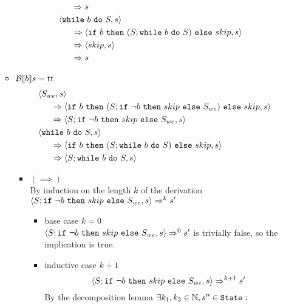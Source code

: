 \begin{exercise}
\begin{enumerate}
\begin{itemize}
\begin{align*}
                        \\&\quad\ \ \Rightarrow s
                        \\
                        &\left<\texttt{while}\ b\ \texttt{do}\ S, s\right>
                        \\&\quad\ \ \Rightarrow \left<\texttt{if}\ b\ \texttt{then}\ (S; \texttt{while}\ b\ \texttt{do}\ S)\ \texttt{else}\ skip, s\right>
                        \\&\quad\ \ \Rightarrow \left<skip, s\right>
                        \\&\quad\ \ \Rightarrow s
                    \end{align*}
                \item $\mathcal{B} \llbracket b \rrbracket s = \text{tt}$
                    \begin{align*}
                        &\left<S_{we}, s\right>
                        \\&\quad\ \ \Rightarrow \left<\texttt{if}\ b\ \texttt{then}\ (S; \texttt{if}\ \neg b\ \texttt{then}\ skip\ \texttt{else}\ S_{we})\ \texttt{else}\ skip, s\right>
                        \\&\quad\ \ \Rightarrow \left<S; \texttt{if}\ \neg b\ \texttt{then}\ skip\ \texttt{else}\ S_{we}, s\right>
                        \\
                        &\left<\texttt{while}\ b\ \texttt{do}\ S, s\right>
                        \\&\quad\ \ \Rightarrow \left<\texttt{if}\ b\ \texttt{then}\ (S; \texttt{while}\ b\ \texttt{do}\ S)\ \texttt{else}\ skip, s\right>
                        \\&\quad\ \ \Rightarrow \left<S; \texttt{while}\ b\ \texttt{do}\ S, s\right>
                    \end{align*}
                    \begin{itemize}
                        \item $(\implies)$ \vspace{0.2cm} \\
                            By induction on the length $k$ of the derivation \\ $\left<S; \texttt{if}\ \neg b\ \texttt{then}\ skip\ \texttt{else}\ S_{we}, s\right> \Rightarrow^k s'$
                            \begin{itemize}
                                \item base case $k=0$ \\
                                    $\left<S; \texttt{if}\ \neg b\ \texttt{then}\ skip\ \texttt{else}\ S_{we}, s\right> \Rightarrow^0 s'$ is trivially false, so the implication is true.
                                \item inductive case $k+1$ \vspace*{-0.3cm}
                                    \[ \left<S; \texttt{if}\ \neg b\ \texttt{then}\ skip\ \texttt{else}\ S_{we}, s\right> \Rightarrow^{k+1} s' \]
                                    By the decomposition lemma $\exists k_1, k_2 \in \mathbb{N}, s'' \in \texttt{State} :$

\end{itemize}
\end{itemize}
\end{itemize}
\end{enumerate}
\end{exercise}
